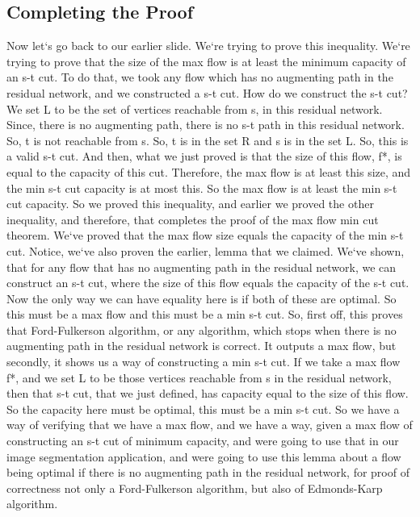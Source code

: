 \subsection{Completing the Proof}
Now let`s go back to our earlier slide.
We`re trying to prove this inequality.
We`re trying to prove that the size of the max flow is at least the minimum capacity of an s-t cut.
To do that, we took any flow which has no augmenting path in the residual network, and we constructed a s-t cut.
How do we construct the s-t cut? We set L to be the set of vertices reachable from s, in this residual network.
Since, there is no augmenting path, there is no s-t path in this residual network.
So, t is not reachable from s.
So, t is in the set R and s is in the set L\@.
So, this is a valid s-t cut.
And then, what we just proved is that the size of this flow, f*, is equal to the capacity of this cut.
Therefore, the max flow is at least this size, and the min s-t cut capacity is at most this.
So the max flow is at least the min s-t cut capacity.
So we proved this inequality, and earlier we proved the other inequality, and therefore, that completes the proof of the max flow min cut theorem.
We`ve proved that the max flow size equals the capacity of the min s-t cut.
Notice, we`ve also proven the earlier, lemma that we claimed.
We`ve shown, that for any flow that has no augmenting path in the residual network, we can construct an s-t cut, where the size of this flow equals the capacity of the s-t cut.
Now the only way we can have equality here is if both of these are optimal.
So this must be a max flow and this must be a min s-t cut.
So, first off, this proves that Ford-Fulkerson algorithm, or any algorithm, which stops when there is no augmenting path in the residual network is correct.
It outputs a max flow, but secondly, it shows us a way of constructing a min s-t cut.
If we take a max flow f*, and we set L to be those vertices reachable from s in the residual network, then that s-t cut, that we just defined, has capacity equal to the size of this flow.
So the capacity here must be optimal, this must be a min s-t cut.
So we have a way of verifying that we have a max flow, and we have a way, given a max flow of constructing an s-t cut of minimum capacity, and were going to use that in our image segmentation application, and were going to use this lemma about a flow being optimal if there is no augmenting path in the residual network, for proof of correctness not only a Ford-Fulkerson algorithm, but also of Edmonds-Karp algorithm.

